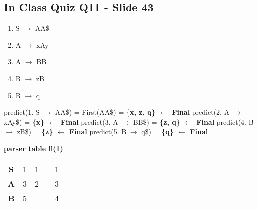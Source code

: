 \documentclass{report}
\begin{document}
\subsection{In Class Quiz Q11 - Slide 43}
\vspace{-1em}
\begin{multicols}{2}
  \begin{enumerate}
    \setlength\itemsep{-.25em}
    \item S $\rightarrow$ AA\$
    \item A $\rightarrow$ xAy
    \item A $\rightarrow$ BB
    \item B $\rightarrow$ zB
    \item B $\rightarrow$ q\newline\newline
  \end{enumerate}
  \setlength{\leftskip}{-12em}
  predict(1. S $\rightarrow$ AA\$) = First(AA\$) = \textbf{ \{x, z, q\} $\leftarrow$ Final}\newline
  predict(2. A $\rightarrow$ xAy\$) = \textbf{ \{x\} $\leftarrow$ Final}\newline
  predict(3. A $\rightarrow$ BB\$) = \textbf{ \{z, q\} $\leftarrow$ Final}\newline
  predict(4. B $\rightarrow$ zB\$) = \textbf{ \{z\} $\leftarrow$ Final}\newline
  predict(5. B $\rightarrow$ q\$) = \textbf {\{q\} $\leftarrow$ Final}\newline
\end{multicols}
\vspace{-1em}
\noindent\textbf{parser table ll(1)}\newline
  \begin{tabular}{|c|c|c|c|c|c|}
    \hline
	  & \thead{q} & \thead{x} & \thead{y} & \thead{z} & \thead{\$}\\
    \hline
	\textbf{S} & 1 & 1 &   & 1 & \\
    \hline
	\textbf{A} & 3 & 2 &   & 3 & \\
    \hline
	\textbf{B} & 5 &   &   & 4 & \\
    \hline
  \end{tabular}
  
\end{document}

